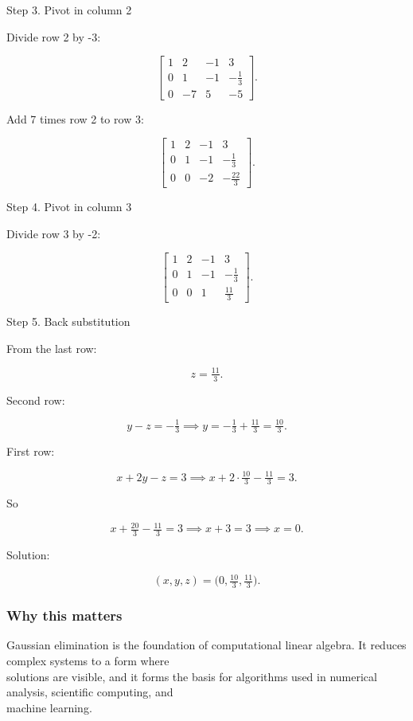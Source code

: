 \documentclass[
  12pt,
  a4paper,
]{article}
\begin{document}
Step 3. Pivot in column 2

Divide row 2 by -3:

\[\left[\begin{array}{ccc|c}
1 & 2 & -1 & 3 \\
0 & 1 & -1 & -\tfrac{1}{3} \\
0 & -7 & 5 & -5
\end{array}\right].\]

Add 7 times row 2 to row 3:

\[\left[\begin{array}{ccc|c}
1 & 2 & -1 & 3 \\
0 & 1 & -1 & -\tfrac{1}{3} \\
0 & 0 & -2 & -\tfrac{22}{3}
\end{array}\right].\]

Step 4. Pivot in column 3

Divide row 3 by -2:

\[\left[\begin{array}{ccc|c}
1 & 2 & -1 & 3 \\
0 & 1 & -1 & -\tfrac{1}{3} \\
0 & 0 & 1 & \tfrac{11}{3}
\end{array}\right].\]

Step 5. Back substitution

From the last row:

\[z = \tfrac{11}{3}.\]

Second row:

\[y - z = -\tfrac{1}{3} \implies y = -\tfrac{1}{3} + \tfrac{11}{3} = \tfrac{10}{3}.\]

First row:

\[x + 2y - z = 3 \implies x + 2\cdot\tfrac{10}{3} - \tfrac{11}{3} = 3.\]

So

\[x + \tfrac{20}{3} - \tfrac{11}{3} = 3 \implies x + 3 = 3 \implies x = 0.\]

Solution:

\[(x,y,z) = \big(0, \tfrac{10}{3}, \tfrac{11}{3}\big).\]

\subsubsection{Why this matters}\label{why-this-matters-9}

Gaussian elimination is the foundation of computational linear algebra.
It reduces complex systems to a form where\\
solutions are visible, and it forms the basis for algorithms used in
numerical analysis, scientific computing, and\\
machine learning.
\end{document}
